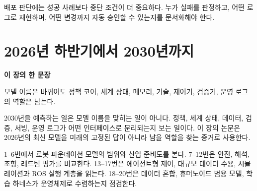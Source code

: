 \documentclass[11pt,openany]{book}
\newcommand{\chaptertakeaway}[1]{%
  \begin{tcolorbox}[
    breakable,
    colback=deepblue,
    colframe=deepblue,
    coltext=white,
    boxrule=0pt,
    arc=2mm,
    left=5mm,right=5mm,top=4mm,bottom=4mm
  ]
  {\sffamily\bfseries\large 이 장의 한 문장}\par\smallskip
  #1
  \end{tcolorbox}
}
\begin{document}
\begin{translationbox}[이 장을 덮기 전에]

배포 판단에는 성공 사례보다 중단 조건이 더 중요하다. 누가 실패를 판정하고, 어떤 로그로 재현하며, 어떤 변경까지 자동 승인할 수 있는지를 문서화해야 한다.

\end{translationbox}

\cleardoublepage

\chapter{2026년 하반기에서 2030년까지}

\chaptertakeaway{모델 이름은 바뀌어도 정책 코어, 세계 상태, 메모리, 기술, 제어기, 검증기, 운영 로그의 역할은 남는다.}

2030년을 예측하는 일은 모델 이름을 맞히는 일이 아니다. 정책, 세계 상태, 데이터, 검증, 서빙, 운영 로그가 어떤 인터페이스로 분리되는지 보는 일이다. 이 장의 논문은 2026년의 최신 모델을 미래의 고정된 답이 아니라 남을 역할을 찾는 증거로 사용한다.

\begin{boardbox}[읽는 순서]

1--6번에서 로봇 파운데이션 모델의 범위와 산업 준비도를 본다. 7--12번은 안전, 해석, 조향, 레드팀 평가를 비교한다. 13--17번은 에이전트형 제어, 대규모 데이터 수용, 시뮬레이션과 ROS 실행 계층을 읽는다. 18--20번은 데이터 혼합, 휴머노이드 범용 모델, 학습 하네스가 운영체제로 수렴하는지 점검한다.

\end{boardbox}
\end{document}
